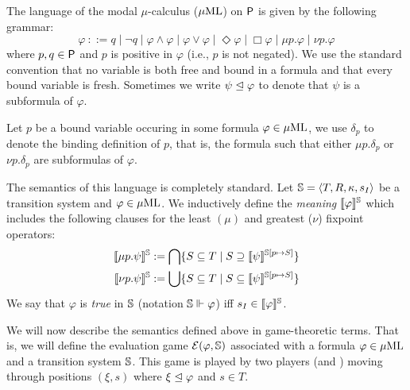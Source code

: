 
The language of the modal $\mu$-calculus ($\mu\mathrm{ML}$) on $\mathsf{P}$ is given by the following grammar:
%
\begin{equation*}
    \varphi\ ::= q \mid \neg q \mid \varphi \land \varphi \mid
    \varphi \lor \varphi \mid  \Diamond \varphi \mid \Box \varphi \mid
    \mu p.\varphi \mid \nu p.\varphi
\end{equation*}
%
where $p,q \in \mathsf{P}$ and $p$ is positive in $\varphi$ (i.e., $p$ is not negated).
We use the standard convention that no variable is both free and bound in a formula and that every bound variable is fresh.
Sometimes we write $\psi \trianglelefteq \varphi$ to denote that $\psi$ is a subformula of $\varphi$.

%
Let $p$ be a bound variable occuring in some formula $\varphi \in \mu\mathrm{ML}$, we use $\delta_p$ to denote the binding definition of $p$, that is, the formula such that either $\mu p.\delta_p$ or $\nu p.\delta_p$ are subformulas of $\varphi$.

The semantics of this language is completely standard. Let $\mathbb{S} = \langle{T,R,\kappa, s_I}\rangle$ be a transition system and $\varphi \in \mu\mathrm{ML}$. We inductively define the \emph{meaning} $\llbracket\varphi\rrbracket^{\mathbb{S}}$ which includes the following clauses for the least $(\mu)$ and greatest ($\nu$) fixpoint operators:
%
\begin{align*}
  \llbracket\mu p.\psi\rrbracket^{\mathbb{S}}  & :=   \bigcap \{S \subseteq T \mid S \supseteq \llbracket\psi\rrbracket^{\mathbb{S}[p\mapsto S]} \}  \\
  \llbracket\nu p.\psi\rrbracket^{\mathbb{S}}  & :=   \bigcup \{S \subseteq T \mid S \subseteq \llbracket\psi\rrbracket^{\mathbb{S}[p\mapsto S]} \}
\end{align*}
%
We say that $\varphi$ is \emph{true} in $\mathbb{S}$ (notation $\mathbb{S} \Vdash \varphi$) iff $s_I \in \llbracket\varphi\rrbracket^{\mathbb{S}}$.%

We will now describe the semantics defined above in game-theoretic terms. That is,
we will define the evaluation game $\mathcal{E}(\varphi,\mathbb{S})$ associated with a formula $\varphi \in \mu\mathrm{ML}$ and a transition system $\mathbb{S}$. This game is played by two players (\eloise and \abelard) moving through positions $(\xi,s)$ where $\xi \trianglelefteq \varphi$ and $s \in T$.
%

